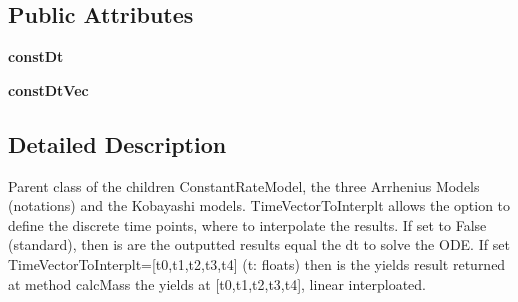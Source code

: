 \subsection*{\-Public \-Attributes}
\begin{DoxyCompactItemize}
\item 
\hypertarget{classModels_1_1Model_aa61209c0f4ac8888bc962fee2e8d688e}{{\bfseries const\-Dt}}\label{classModels_1_1Model_aa61209c0f4ac8888bc962fee2e8d688e}

\item 
\hypertarget{classModels_1_1Model_a3f71983de5f8b86bec47929213b900ec}{{\bfseries const\-Dt\-Vec}}\label{classModels_1_1Model_a3f71983de5f8b86bec47929213b900ec}

\end{DoxyCompactItemize}


\subsection{\-Detailed \-Description}
\begin{DoxyVerb}Parent class of the children ConstantRateModel, the three Arrhenius Models (notations) and the Kobayashi models. TimeVectorToInterplt allows the option to define the discrete time points, where to interpolate the results. If set to False (standard), then is are the outputted results equal the dt to solve the ODE. If set TimeVectorToInterplt=[t0,t1,t2,t3,t4] (t: floats) then is the yields result returned at method calcMass the yields at [t0,t1,t2,t3,t4], linear interploated.\end{DoxyVerb}
 

